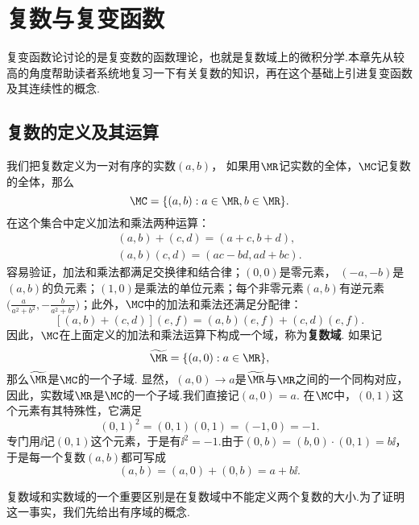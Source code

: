 \chapter{复数与复变函数\label{chap1}}
复变函数论讨论的是复变数的函数理论，也就是复数域上的微积分学.本章先从较高的角度帮助读者系统地复习一下有关复数的知识，再在这个基础上引进复变函数及其连续性的概念.

\section{复数的定义及其运算\label{sec1.1}}
我们把复数定义为一对有序的实数$(a,b)$， 如果用$\MR$记实数的全体，$\MC$记复数的全体，那么
\[
  \MC = \{(a,b): a\in\MR, b\in\MR \}.
\]
在这个集合中定义加法和乘法两种运算：
\begin{gather*}
  (a,b) + (c,d) = (a + c, b + d),\\
  (a,b)(c,d) = (ac - bd, ad + bc).
\end{gather*}
容易验证，加法和乘法都满足交换律和结合律；$(0,0)$是零元素，
$(-a,-b)$是$(a,b)$的负元素；$(1,0)$是乘法的单位元素；每个非零元素$(a,b)$有逆元素$\bigg(\frac a{a^2+b^2},-\frac b{a^2+b^2}\bigg)$；此外，$\MC$中的加法和乘法还满足分配律：
\[
  [(a,b) + (c,d)](e,f) = (a,b)(e,f) + (c,d)(e,f).
\]
因此，$\MC$在上面定义的加法和乘法运算下构成一个域，称为\textbf{复数域}. 如果记
\[
  \widetilde{\MR} = \{(a,0): a\in\MR \},
\]
那么$\widetilde{\MR}$是$\MC$的一个子域. 显然，$(a,0)\to a$是$\widetilde{\MR}$与$\MR$之间的一个同构对应，因此，实数域$\MR$是$\MC$的一个子域.我们直接记$(a,0)=a$. 在$\MC$中，$(0,1)$这个元素有其特殊性，它满足
\[
  (0,1)^2 = (0,1)(0,1) = (-1,0) = -1.
\]
专门用$\ii$记$(0,1)$这个元素，于是有$\ii^2=-1$.由于$(0,b)=(b,0)\cdot(0,1)=b\ii$，于是每一个复数$(a,b)$都可写成
\[
  (a,b) = (a,0) + (0,b) = a + b\ii.
\]

复数域和实数域的一个重要区别是在复数域中不能定义两个复数的大小.为了证明这一事实，我们先给出有序域的概念.

